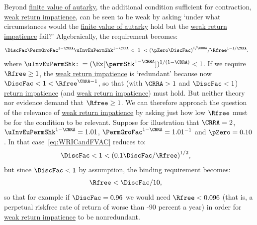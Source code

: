 \documentclass[\econtexRoot/BufferStockTheory]{subfiles}
\begin{document}
Beyond \hyperlink{FVAC}{finite value of autarky},
the additional condition sufficient for contraction, \hyperlink{WRIC}{weak return impatience}, can be seen to be weak by asking `under what circumstances would the \hyperlink{FVAC}{finite value of autarky} hold but the \hyperlink{WRIC}{weak return impatience} fail?'  Algebraically, the requirement becomes:
%
\begin{equation}\begin{gathered}\begin{aligned}
  \DiscFac \PermGroFac^{1-\CRRA}\uInvEuPermShk^{1-\CRRA} & < ~ 1 ~ <  {(\pZero \DiscFac)}^{1/\CRRA}/\Rfree^{1-1/\CRRA}. \label{eq:WRICandFVAC}
\end{aligned}\end{gathered}\end{equation}
%
\hypertarget{uInvEuPermShk}{}
where $\uInvEuPermShk \colon = (\Ex[\permShk^{1-\CRRA}])^{1/(1-\CRRA)} < 1$.
If we require $\Rfree \geq 1$, the \hyperlink{WRIC}{weak return impatience} is `redundant' because now $\DiscFac <1<\Rfree^{\CRRA-1}$, so that (with $\CRRA > 1$ and $\DiscFac<1$) \hyperlink{RIC}{return impatience} (and \hyperlink{WRIC}{weak return impatience}) must hold.
But neither theory nor evidence demand that $\Rfree \geq 1$.
We can therefore approach the question of the relevance of \hyperlink{WRIC}{weak return impatience}  by asking just how low $\Rfree$ must be for the condition to be relevant.
Suppose for illustration that $\CRRA=2$, $\uInvEuPermShk^{1-\CRRA}=1.01$, $\PermGroFac^{1-\CRRA}=1.01^{-1}$ and $\pZero = 0.10$.
In that case~\eqref{eq:WRICandFVAC} reduces to:
\begin{equation}\begin{gathered}\begin{aligned}
  \DiscFac  & < 1 < {(0.1 \DiscFac/\Rfree)}^{1/2},
\end{aligned}\end{gathered}\end{equation}
but since $\DiscFac < 1$ by assumption, the binding requirement becomes:
\begin{equation}\begin{gathered}\begin{aligned}
  \Rfree  & < \DiscFac/10, \notag
\end{aligned}\end{gathered}\end{equation}
so that for example if $\DiscFac=0.96$ we would need $\Rfree < 0.096$ (that is, a perpetual riskfree rate of return of worse than -90 percent a year) in order for \hyperlink{WRIC}{weak return impatience} to be nonredundant.
\end{document}
